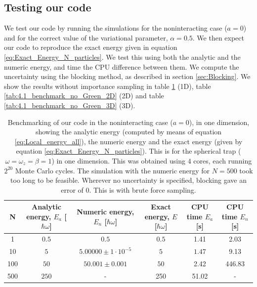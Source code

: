 \documentclass[a4paper, 10pt]{article}
\begin{document}
	\subsection{Testing our code}
	We test our code by running the simulations for the noninteracting case ($a=0$) and for the correct value of the variational parameter, $\alpha=0.5$. We then expect our code to reproduce the exact energy given in equation \ref{eq:Exact_Energy_N_particles}. We test this using both the analytic and the numeric energy, and time the CPU difference between them.  We compute the uncertainty using the blocking method, as described in section \ref{sec:Blocking}. We show the results without importance sampling in table \ref{tab:4.1_benchmark_no_Green} (1D), table \ref{tab:4.1_benchmark_no_Green_2D} (2D)  and table \ref{tab:4.1_benchmark_no_Green_3D} (3D).\\
	\begin{table}[ht!]
		\caption{Benchmarking of our code in the noninteracting case ($a=0$), in one dimension, showing the analytic energy (computed by means of equation \ref{eq:Local_energy_all}), the numeric energy and the exact energy (given by equation \ref{eq:Exact_Energy_N_particles}). This is for the spherical trap ($\omega=\omega_z=\beta=1$) in one dimension. This was obtained using $4$ cores, each running $2^{20}$ Monte Carlo cycles. The simulation with the numeric energy for $N=500$ took too long to be feasible. Wherever no uncertainty is specified, blocking gave an error of $0$. This is with brute force sampling.}\label{tab:4.1_benchmark_no_Green}
		\begin{adjustwidth}{-2cm}{}
			\begin{tabular}{cccccc}
				N & Analytic energy, $E_a$ [$\hbar \omega$] & Numeric energy, $E_n$ [$\hbar \omega$] & Exact energy, $E$ [$\hbar \omega$]& CPU time $E_a$ [s] &CPU time $E_n$ [s]\\
				\hline
				1&$0.5$&$0.5$&$0.5$& 1.41&2.03\\
				10&$5$&$5.00000\pm 1\cdot 10^{-5}$&$5$& $1.47$&9.13\\
				100&$50$&$50.001\pm 0.001$&$50$&2.42&446.83\\
				500&$250$&-&250 &51.02 &-
			\end{tabular}
		\end{adjustwidth}
	\end{table}
\end{document}
